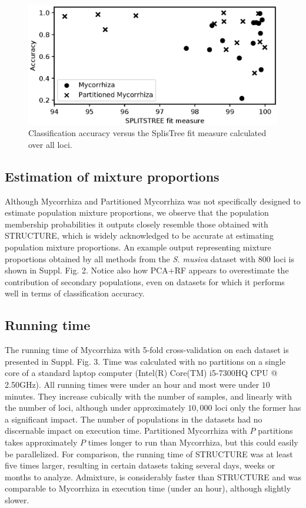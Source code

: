 \documentclass{bioinfo}
\begin{document}
\begin{figure}[!tbp]%
    \includegraphics[width=\linewidth]{figure5.eps}
    \caption{Classification accuracy versus the SplisTree fit measure calculated over all loci.}\label{fig:05}
\end{figure}
\subsection{Estimation of mixture proportions}
Although Mycorrhiza and Partitioned Mycorrhiza was not specifically designed to estimate population mixture proportions, we observe that the population membership probabilities it outputs closely resemble those obtained with STRUCTURE, which is widely acknowledged to be accurate at estimating population mixture proportions. An example output representing mixture proportions obtained by all methods from the \textit{S. musiva} dataset with $800$ loci is shown in Suppl. Fig. 2. Notice also how PCA+RF appears to overestimate the contribution of secondary populations, even on datasets for which it performs well in terms of classification accuracy.
\subsection{Running time}
The running time of Mycorrhiza with 5-fold cross-validation on each dataset is presented in Suppl. Fig. 3. Time was calculated with no partitions on a single core of a standard laptop computer (Intel(R) Core(TM) i5-7300HQ CPU @ 2.50GHz). All running times were under an hour and most were under $10$ minutes. They increase cubically with the number of samples, and linearly with the number of loci, although under approximately $10,000$ loci only the former has a significant impact. The number of populations in the datasets had no discernable impact on execution time. Partitioned Mycorrhiza with $P$ partitions takes approximately $P$ times longer to run than Mycorrhiza, but this could easily be parallelized. For comparison, the running time of STRUCTURE was at least five times larger, resulting in certain datasets taking several days, weeks or months to analyze. Admixture, is considerably faster than STRUCTURE and was comparable to Mycorrhiza in execution time (under an hour), although slightly slower.
\end{document}
